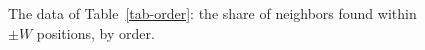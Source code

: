 \begin{figure}[t]
\centering

\caption{The data of Table~\ref{tab-order}: the share of neighbors found within $\pm W$ positions, by order.}
\label{fig-order}
\end{figure}
